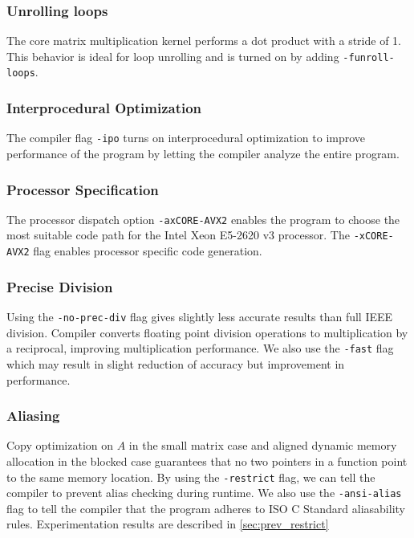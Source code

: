 \documentclass[11pt]{article}
\begin{document}
\subsubsection{Unrolling loops}
The core matrix multiplication kernel performs a dot product with a stride of 1. This behavior is ideal for loop unrolling and is turned on by adding \texttt{-funroll-loops}. 

\subsubsection{Interprocedural Optimization}
The compiler flag \texttt{-ipo} turns on interprocedural optimization to improve performance of the program by letting the compiler analyze the entire program. \cite{ipo}

\subsubsection{Processor Specification}
The processor dispatch option \texttt{-axCORE-AVX2} enables the program to choose the most suitable code path for the Intel Xeon E5-2620 v3 processor. The \texttt{-xCORE-AVX2} flag enables processor specific code generation. \cite{comp_opt}


\subsubsection{Precise Division}
Using the \texttt{-no-prec-div} flag gives slightly less accurate results than full IEEE division. Compiler converts floating point division operations to multiplication by a reciprocal, improving multiplication performance. We also use the \texttt{-fast} flag which may result in slight reduction of accuracy but improvement in performance. 

\subsubsection{Aliasing}

Copy optimization on $A$ in the small matrix case and aligned dynamic memory allocation in the blocked case guarantees that no two pointers in a function point to the same memory location. By using the \texttt{-restrict} flag, we can tell the compiler to prevent alias checking during runtime. \cite{opt} We also use the \texttt{-ansi-alias} flag to tell the compiler that the program adheres to ISO C Standard aliasability rules. Experimentation results are described in \ref{sec:prev_restrict}
\end{document}
